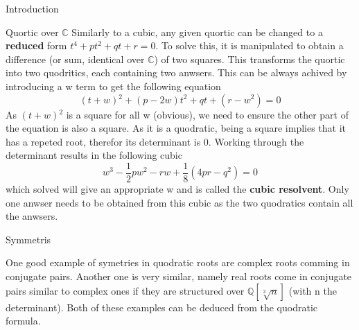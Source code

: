 \documentclass[12pt, letterpaper]{article}
\newcommand{\C}{\mathbb{C}}
\newcommand{\Q}{\mathbb{Q}}
\begin{document}
\begin{section}{Introduction}
\begin{subsection}{Quortic over \(\C\)}
    Similarly to a cubic, any given quortic can be changed to a
    \textbf{reduced} form \(t^{4} + pt^{2} + qt + r = 0\). To solve this, it is
    manipulated to obtain a difference (or sum, identical over \(\C\))
    of two squares. This transforms the quortic into two quodritics, each
    containing two anwsers. This can be always achived by introducing a w term
    to get the following equation
    \[(t + w){}^{2} + (p - 2w)t^{2} + qt + (r - w^{2}) = 0\]
    As \((t + w){}^{2}\) is a square for all w (obvious), we need to ensure the
    other part of the equation is also a square. As it is a quodratic, being a
    square implies that it has a repeted root, therefor its determinant is 0.
    Working through the determinant results in the following cubic
    \[w^{3} - \frac{1}{2}pw^{2} - rw + \frac{1}{8}(4pr - q^{2}) = 0\] which
    solved will give an appropriate w and is called the \textbf{cubic resolvent}.
    Only one anwser needs to be obtained from this cubic as the two quodratics
    contain all the anwsers.

  \end{subsection}

  \begin{subsection}{Symmetris}

    One good example of symetries in quodratic roots are complex roots comming
    in conjugate pairs. Another one is very similar, namely real roots come in
    conjugate pairs similar to complex ones if they are structured over
    \(\Q[\sqrt[2]{n}]\) (with n the determinant). Both of these examples
    can be deduced from the quodratic formula.

  \end{subsection}

\end{section}
\end{document}
